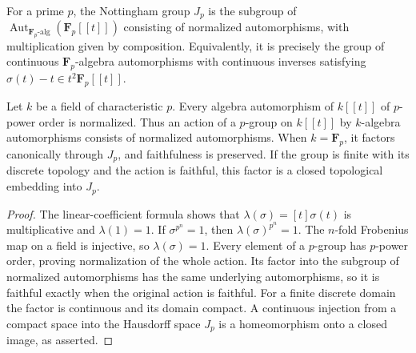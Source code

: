 \begin{definition}
\label{def:nottingham-group}
\leanok
For a prime $p$, the Nottingham group $J_p$ is the subgroup of
$\operatorname{Aut}_{\mathbf F_p\text{-alg}}(\mathbf F_p[[t]])$
consisting of normalized automorphisms, with multiplication given by
composition. Equivalently, it is precisely the group of continuous
$\mathbf F_p$-algebra automorphisms with continuous inverses satisfying
$\sigma(t)-t\in t^2\mathbf F_p[[t]]$.
\end{definition}

\begin{lemma}
\label{lem:pgroup-power-series-normalization}
\leanok
Let $k$ be a field of characteristic $p$. Every algebra automorphism
of $k[[t]]$ of $p$-power order is normalized. Thus an action of a
$p$-group on $k[[t]]$ by $k$-algebra automorphisms consists of
normalized automorphisms. When $k=\mathbf F_p$, it factors canonically
through $J_p$, and faithfulness is preserved. If the group is finite
with its discrete topology and the action is faithful, this factor
is a closed topological embedding into $J_p$.
\end{lemma}

\begin{proof}
The linear-coefficient formula shows that
$\lambda(\sigma)=[t]\sigma(t)$ is multiplicative and
$\lambda(1)=1$. If $\sigma^{p^n}=1$, then
$\lambda(\sigma)^{p^n}=1$.
The $n$-fold Frobenius map on a field is injective, so
$\lambda(\sigma)=1$. Every element of a $p$-group has
$p$-power order, proving normalization of the whole action.
Its factor into the subgroup of normalized automorphisms has
the same underlying automorphisms, so it is faithful exactly
when the original action is faithful. For a finite discrete
domain the factor is continuous and its domain compact.
A continuous injection from a compact space into the Hausdorff
space $J_p$ is a homeomorphism onto a closed image, as asserted.
\end{proof}

